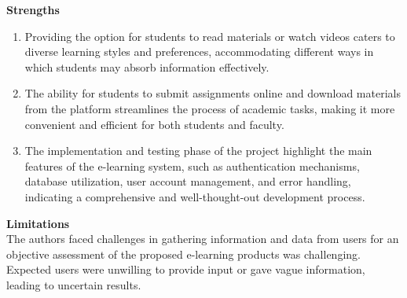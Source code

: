 \documentclass[a4paper,12pt]{article}  %
\begin{document}
\textbf{Strengths }\\
\begin{enumerate}
      \item Providing the option for students to read materials or watch videos caters to
            diverse learning styles and preferences, accommodating different ways in which
            students may absorb information effectively.\\
      \item The ability for students to submit assignments online and download materials
            from the platform streamlines the process of academic tasks, making it more
            convenient and efficient for both students and faculty.\\
      \item The implementation and testing phase of the project highlight the main features
            of the e-learning system, such as authentication mechanisms, database
            utilization, user account management, and error handling, indicating a
            comprehensive and well-thought-out development process.\\
\end{enumerate}

\textbf{Limitations}\\
The authors faced challenges in gathering information and data from
users for an objective assessment of the proposed e-learning products was
challenging. Expected users were unwilling to provide input or gave vague
information, leading to uncertain results.\\
\end{document}
